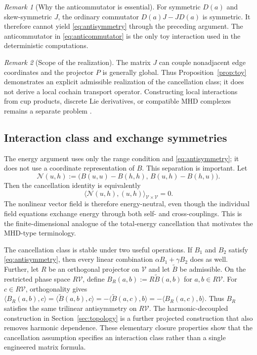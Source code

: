 \documentclass[11pt]{article}
\theoremstyle{remark}
\newtheorem{remark}{Remark}
\begin{document}
\begin{remark}[Why the anticommutator is essential]
For symmetric $D(a)$ and skew-symmetric $J$, the ordinary commutator $D(a)J-JD(a)$ is symmetric. It therefore cannot yield \eqref{eq:antisymmetry} through the preceding argument. The anticommutator in \eqref{eq:anticommutator} is the only toy interaction used in the deterministic computations.
\end{remark}

\begin{remark}[Scope of the realization]
The matrix $J$ can couple nonadjacent edge coordinates and the projector $P$ is generally global. Thus Proposition~\ref{prop:toy} demonstrates an explicit admissible realization of the cancellation class; it does not derive a local cochain transport operator. Constructing local interactions from cup products, discrete Lie derivatives, or compatible MHD complexes remains a separate problem \cite{MullenEtAl2011,HiptmairPagliantini2018}.
\end{remark}

\subsection{Interaction class and exchange symmetries}

The energy argument uses only the range condition and \eqref{eq:antisymmetry}; it does not use a coordinate representation of $B$. This separation is important. Let
\[
\mathcal N(u,h):=\bigl(B(u,u)-B(h,h),\,B(u,h)-B(h,u)\bigr).
\]
Then the cancellation identity is equivalently
\begin{equation}
\langle\mathcal N(u,h),(u,h)\rangle_{\mathcal V\times\mathcal V}=0.
\label{eq:vectorcancellation}
\end{equation}
The nonlinear vector field is therefore energy-neutral, even though the individual field equations exchange energy through both self- and cross-couplings. This is the finite-dimensional analogue of the total-energy cancellation that motivates the MHD-type terminology.

The cancellation class is stable under two useful operations. If $B_1$ and $B_2$ satisfy \eqref{eq:antisymmetry}, then every linear combination $\alpha B_1+\gamma B_2$ does as well. Further, let $R$ be an orthogonal projector on $\mathcal V$ and let $\widetilde B$ be admissible. On the restricted phase space $R\mathcal V$, define $B_R(a,b):=R\widetilde B(a,b)$ for $a,b\in R\mathcal V$. For $c\in R\mathcal V$, orthogonality gives $\langle B_R(a,b),c\rangle=\langle\widetilde B(a,b),c\rangle=-\langle\widetilde B(a,c),b\rangle=-\langle B_R(a,c),b\rangle$. Thus $B_R$ satisfies the same trilinear antisymmetry on $R\mathcal V$. The harmonic-decoupled construction in Section~\ref{sec:topology} is a further projected construction that also removes harmonic dependence. These elementary closure properties show that the cancellation assumption specifies an interaction class rather than a single engineered matrix formula.
\end{document}
